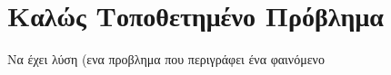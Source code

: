 \documentclass[a4paper,table]{report}
\begin{document}
\section*{Καλώς Τοποθετημένο Πρόβλημα}

\begin{myitemize}
  \item Να έχει λύση (ενα προβλημα που περιγράφει ένα φαινόμενο
\end{myitemize}
\end{document}
